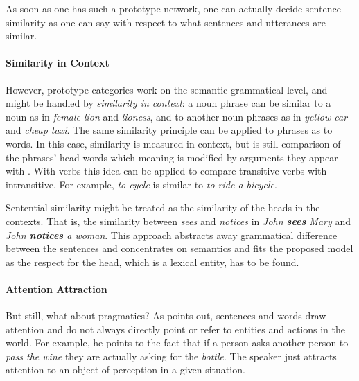 \documentclass[11pt]{article}
\begin{document}
As soon as one has such a prototype network, one can actually decide sentence similarity as one can say with respect to what sentences and utterances are similar. 

\paragraph{Similarity in Context}

However, prototype categories work on the semantic-grammatical level, and might be handled by \emph{similarity in context}: a noun phrase can be similar to a noun as in \textit{female lion} and \textit{lioness}, and to another noun phrases as in \textit{yellow car} and \textit{cheap taxi}. The same similarity principle can be applied to phrases as to words. In this case, similarity is measured in context, but is still comparison of the phrases' head words which meaning is modified by arguments they appear with \cite{Kintsch2001173,mitchell-lapata:2008:ACLMain,mitchell2010composition,Dinu:2010:MDS:1870658.1870771,Baroni2010nouns,thater-furstenau-pinkal:2011:IJCNLP-2011,Seaghdha:2011:PMS:2145432.2145545}. With verbs this idea can be applied to compare transitive verbs with intransitive. For example, \textit{to cycle} is similar to \textit{to ride a bicycle}.

Sentential similarity might be treated as the similarity of the heads in the contexts. That is, the similarity between \textit{sees} and \textit{notices} in \textit{John \textbf{sees} Mary} and \textit{John \textbf{notices} a woman}. This approach abstracts away grammatical difference between the sentences and concentrates on semantics and fits the proposed model as the respect for the head, which is a lexical entity, has to be found.


\paragraph{Attention Attraction}

But still, what about pragmatics? As  points out, sentences and words draw attention and do not always directly point or refer to entities and actions in the world. For example, he points to the fact that if a person asks another person to \textit{pass the wine} they are actually asking for the \textit{bottle}. The speaker just attracts attention to an object of perception in a given situation.
\end{document}

